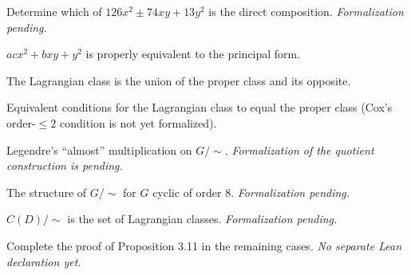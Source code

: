 \begin{theorem}[Exercise 3.6(b)]
  \label{exr:s3_6_b}
  \notready
  Determine which of $126x^2\pm74xy+13y^2$ is the direct composition.
  \emph{Formalization pending.}
\end{theorem}

\begin{theorem}[Exercise 3.7]
  \label{exr:s3_7}
  \leanok
  $acx^2+bxy+y^2$ is properly equivalent to the principal form.
\end{theorem}

\begin{theorem}[Exercise 3.8(a)]
  \label{exr:s3_8_a}
  \leanok
  The Lagrangian class is the union of the proper class and its opposite.
\end{theorem}

\begin{theorem}[Exercise 3.8(b)]
  \label{exr:s3_8_b}
  \leanok
  Equivalent conditions for the Lagrangian class to equal the proper class (Cox's
  order-$\le2$ condition is not yet formalized).
\end{theorem}

\begin{theorem}[Exercise 3.9(a)]
  \label{exr:s3_9_a}
  \notready
  Legendre's ``almost'' multiplication on $G/\!\sim$.
  \emph{Formalization of the quotient construction is pending.}
\end{theorem}

\begin{theorem}[Exercise 3.9(b)]
  \label{exr:s3_9_b}
  \notready
  The structure of $G/\!\sim$ for $G$ cyclic of order $8$. \emph{Formalization pending.}
\end{theorem}

\begin{theorem}[Exercise 3.9(c)]
  \label{exr:s3_9_c}
  \notready
  $C(D)/\!\sim$ is the set of Lagrangian classes. \emph{Formalization pending.}
\end{theorem}

\begin{theorem}[Exercise 3.10]
  \label{exr:s3_10}
  \notready
  Complete the proof of Proposition 3.11 in the remaining cases.
  \emph{No separate Lean declaration yet.}
\end{theorem}


